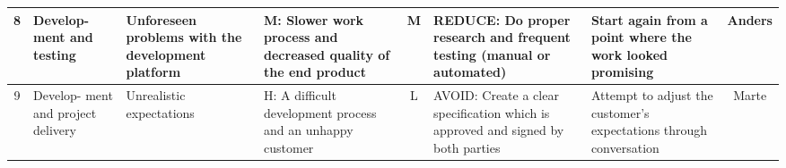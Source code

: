 \begin{landscape}
\begin{table}
\begin{tabular}{| c | p{1.5cm} | p{4cm} | p{4cm} | c | p{4cm} | p{4cm} | c |}
   	8 & Develop- ment and testing & Unforeseen problems with the development platform & 
	M: Slower work process and decreased quality of the end product & M & REDUCE: Do proper research and frequent testing (manual or automated) & Start again from a point where the work looked promising &Anders \\ \hline

   	9 & Develop- ment and project delivery & Unrealistic expectations & H: A difficult development process and an unhappy customer & L & AVOID: Create a clear specification which is approved and signed by both parties & Attempt to adjust the customer’s expectations through conversation & Marte \\
   	\hline
    \end{tabular}
    \end{table}
\end{landscape}

\pagestyle{fancy}
